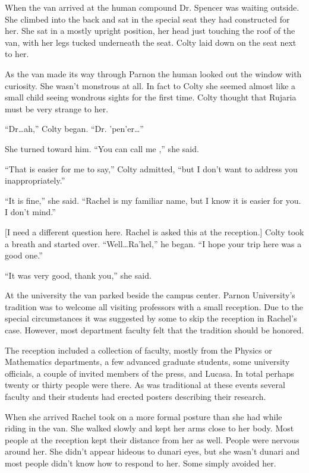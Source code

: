 
When the van arrived at the human compound Dr. Spencer was waiting outside. She climbed into the
back and sat in the special seat they had constructed for her. She sat in a mostly upright
position, her head just touching the roof of the van, with her legs tucked underneath the seat.
Colty laid down on the seat next to her.

As the van made its way through Parnon the human looked out the window with curiosity. She
wasn't monstrous at all. In fact to Colty she seemed almost like a small child seeing wondrous
sights for the first time. Colty thought that Rujaria must be very strange to her.

``Dr\ldots ah,'' Colty began. ``Dr. 'pen'er\ldots''

She turned toward him. ``You can call me ,'' she said.

``That is easier for me to say,'' Colty admitted, ``but I don't want to address you
inappropriately.''

``It is fine,'' she said. ``Rachel is my familiar name, but I know it is easier for you. I don't
mind.''

[I need a different question here. Rachel is asked this at the reception.]
Colty took a breath and started over. ``Well\ldots Ra'hel,'' he began. ``I hope your trip here
was a good one.''

``It was very good, thank you,'' she said.

At the university the van parked beside the campus center. Parnon University's tradition was to
welcome all visiting professors with a small reception. Due to the special circumstances it was
suggested by some to skip the reception in Rachel's case. However, most department faculty felt
that the tradition should be honored.

The reception included a collection of faculty, mostly from the Physics or Mathematics
departments, a few advanced graduate students, some university officials, a couple of invited
members of the press, and Lucasa. In total perhaps twenty or thirty people were there. As was
traditional at these events several faculty and their students had erected posters describing
their research.

When she arrived Rachel took on a more formal posture than she had while riding in the van. She
walked slowly and kept her arms close to her body. Most people at the reception kept their
distance from her as well. People were nervous around her. She didn't appear hideous to dunari
eyes, but she wasn't dunari and most people didn't know how to respond to her. Some simply
avoided her.

